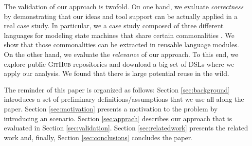 The validation of our approach is twofold. On one hand, we evaluate \textit{correctness} by demonstrating that our ideas and tool support can be actually applied in a real case study. In particular, we a case study composed of three different languages for modeling state machines that share certain commonalities \cite{Crane:2007}. We show that those commonalities can be extracted in reusable language modules. On the other hand, we evaluate the \textit{relevance} of our approach. To this end, we explore public \textsc{GitHub} repositories and download a big set of DSLs where we apply our analysis. We found that there is large potential reuse in the wild. 


The reminder of this paper is organized as follows: Section \ref{sec:background} introduces a set of preliminary definitions/assumptions that we use all along the paper. Section \ref{sec:motivation} presents a motivation to the problem by introducing an scenario. Section \ref{sec:apprach} describes our approach that is evaluated in Section \ref{sec:validation}. Section \ref{sec:relatedwork} presents the related work and, finally, Section \ref{sec:conclusions} concludes the paper. 



